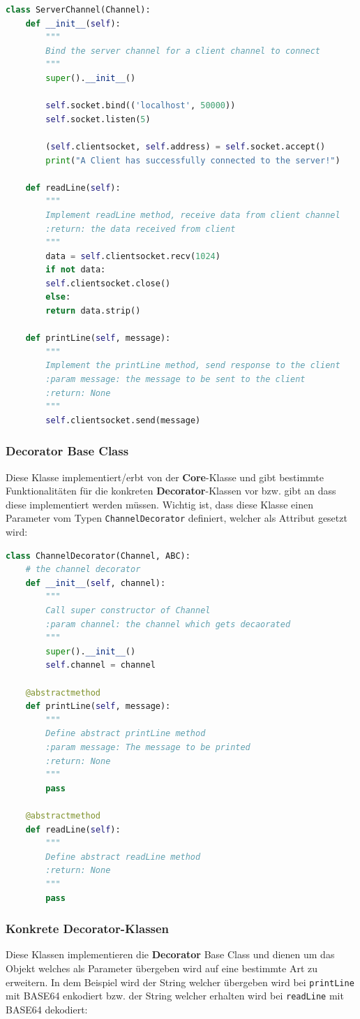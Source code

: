 \begin{lstlisting}[language=Python]
class ServerChannel(Channel):
	def __init__(self):
		"""
		Bind the server channel for a client channel to connect
		"""
		super().__init__()
		
		self.socket.bind(('localhost', 50000))
		self.socket.listen(5)
		
		(self.clientsocket, self.address) = self.socket.accept()
		print("A Client has successfully connected to the server!")
	
	def readLine(self):
		"""
		Implement readLine method, receive data from client channel
		:return: the data received from client
		"""
		data = self.clientsocket.recv(1024)
		if not data:
		self.clientsocket.close()
		else:
		return data.strip()
	
	def printLine(self, message):
		"""
		Implement the printLine method, send response to the client
		:param message: the message to be sent to the client
		:return: None
		"""
		self.clientsocket.send(message)
\end{lstlisting}

\subsubsection{Decorator Base Class}
Diese Klasse implementiert/erbt von der \textbf{Core}-Klasse und gibt bestimmte Funktionalitäten für die konkreten \textbf{Decorator}-Klassen vor bzw. gibt an dass diese implementiert werden müssen. Wichtig ist, dass diese Klasse einen Parameter vom Typen \verb|ChannelDecorator| definiert, welcher als Attribut gesetzt wird: 

\clearpage
\begin{lstlisting}[language=Python]
class ChannelDecorator(Channel, ABC):
	# the channel decorator
	def __init__(self, channel):
		"""
		Call super constructor of Channel
		:param channel: the channel which gets decaorated
		"""
		super().__init__()
		self.channel = channel
	
	@abstractmethod
	def printLine(self, message):
		"""
		Define abstract printLine method
		:param message: The message to be printed
		:return: None
		"""
		pass
	
	@abstractmethod
	def readLine(self):
		"""
		Define abstract readLine method
		:return: None
		"""
		pass
\end{lstlisting}

\subsubsection{Konkrete Decorator-Klassen}
Diese Klassen implementieren die \textbf{Decorator} Base Class und dienen um das Objekt welches als Parameter übergeben wird auf eine bestimmte Art zu erweitern. In dem Beispiel wird der String welcher übergeben wird bei \verb|printLine| mit BASE64 enkodiert bzw. der String welcher erhalten wird bei \verb|readLine| mit BASE64 dekodiert:

